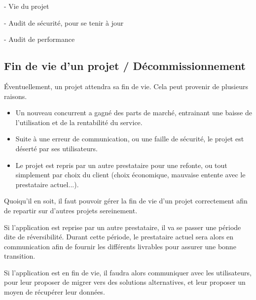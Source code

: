 
- Vie du projet

- Audit de sécurité, pour se tenir à jour

- Audit de performance

\subsection{Fin de vie d'un projet / Décommissionnement}

Éventuellement, un projet attendra sa fin de vie. Cela peut provenir de plusieurs raisons.

\begin{itemize}
	\item Un nouveau concurrent a gagné des parts de marché, entrainant une baisse de l'utilisation et de la rentabilité du service.
	\item Suite à une erreur de communication, ou une faille de sécurité, le projet est déserté par ses utilisateurs.
	\item Le projet est repris par un autre prestataire pour une refonte, ou tout simplement par choix du client (choix économique, mauvaise entente avec le prestataire actuel...).
\end{itemize}

Quoiqu'il en soit, il faut pouvoir gérer la fin de vie d'un projet correctement afin de repartir sur d'autres projets sereinement. 

Si l'application est reprise par un autre prestataire, il va se passer une période dite de réversibilité. Durant cette période, le prestataire actuel sera alors en communication afin de fournir les différents livrables pour assurer une bonne transition. 

Si l'application est en fin de vie, il faudra alors communiquer avec les utilisateurs, pour leur proposer de migrer vers des solutions alternatives, et leur proposer un moyen de récupérer leur données.
